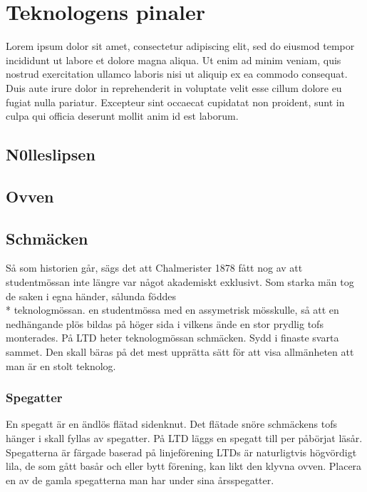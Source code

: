 \pagestyle{Teknologens pinaler}

\section*{\textbf{Teknologens pinaler}}

Lorem ipsum dolor sit amet, consectetur adipiscing elit, sed do eiusmod tempor incididunt ut labore et dolore magna aliqua.
Ut enim ad minim veniam, quis nostrud exercitation ullamco laboris nisi ut aliquip ex ea commodo consequat.
Duis aute irure dolor in reprehenderit in voluptate velit esse cillum dolore eu fugiat nulla pariatur.
Excepteur sint occaecat cupidatat non proident, sunt in culpa qui officia deserunt mollit anim id est laborum.
\subsection*{\textbf{N0lleslipsen}}
\subsection*{\textbf{Ovven}}
\subsection*{\textbf{Schmäcken}}
Så som historien går, sägs det att Chalmerister 1878 fått nog av att studentmössan inte  längre var något akademiskt exklusivt.
Som starka män tog de saken i egna händer, sålunda föddes\\* teknologmössan. en studentmössa med en assymetrisk mösskulle, så att
en nedhängande plös bildas på höger sida i vilkens ände en stor prydlig tofs monterades. På LTD heter teknologmössan schmäcken. Sydd i finaste svarta sammet.
Den skall bäras på det mest upprätta sätt för att visa allmänheten att man är en stolt teknolog.
\subsubsection*{\textbf{Spegatter}}
En spegatt är en ändlös flätad sidenknut. Det flätade snöre schmäckens tofs hänger i skall fyllas av spegatter. På LTD läggs en spegatt till per påbörjat läsår.
Spegatterna är färgade baserad på linjeförening LTDs är naturligtvis högvördigt lila, de som gått basår och eller bytt förening, kan likt den klyvna ovven.
Placera en av de gamla spegatterna man har under sina årsspegatter. 

